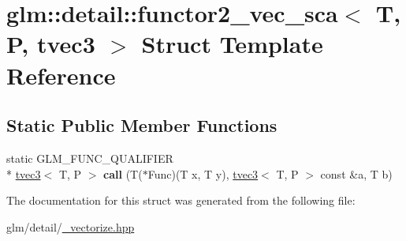 \hypertarget{structglm_1_1detail_1_1functor2__vec__sca_3_01T_00_01P_00_01tvec3_01_4}{\section{glm\-:\-:detail\-:\-:functor2\-\_\-vec\-\_\-sca$<$ T, P, tvec3 $>$ Struct Template Reference}
\label{structglm_1_1detail_1_1functor2__vec__sca_3_01T_00_01P_00_01tvec3_01_4}
}
\subsection*{Static Public Member Functions}
\begin{DoxyCompactItemize}
\item 
\hypertarget{structglm_1_1detail_1_1functor2__vec__sca_3_01T_00_01P_00_01tvec3_01_4_a9abcc48de3dedce9cbb07d47d520dbc5}{static G\-L\-M\-\_\-\-F\-U\-N\-C\-\_\-\-Q\-U\-A\-L\-I\-F\-I\-E\-R \\*
\hyperlink{structglm_1_1tvec3}{tvec3}$<$ T, P $>$ {\bfseries call} (T($\ast$Func)(T x, T y), \hyperlink{structglm_1_1tvec3}{tvec3}$<$ T, P $>$ const \&a, T b)}\label{structglm_1_1detail_1_1functor2__vec__sca_3_01T_00_01P_00_01tvec3_01_4_a9abcc48de3dedce9cbb07d47d520dbc5}

\end{DoxyCompactItemize}


The documentation for this struct was generated from the following file\-:\begin{DoxyCompactItemize}
\item 
glm/detail/\hyperlink{__vectorize_8hpp}{\-\_\-vectorize.\-hpp}\end{DoxyCompactItemize}
